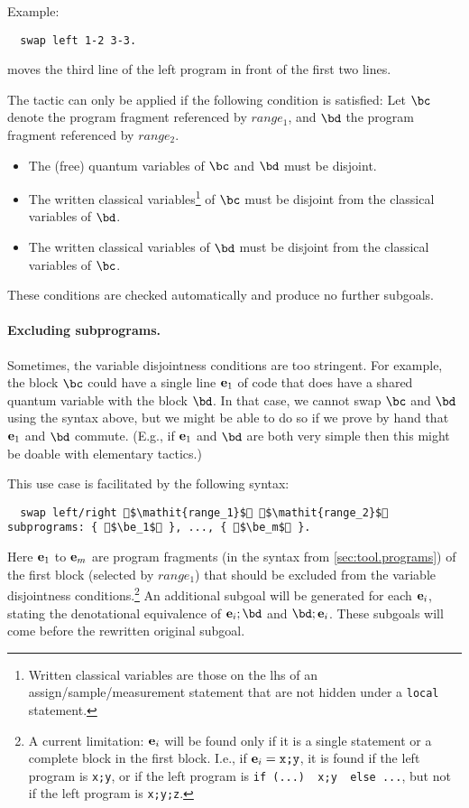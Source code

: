 \documentclass{article}
\begin{document}
Example:
\begin{lstlisting}
  swap left 1-2 3-3.
\end{lstlisting}
moves the third line of the left program in front of the first two lines.

\medskip

The tactic can only be applied if the following condition is
satisfied:
Let $\bc$ denote the program fragment referenced by $\mathit{range_1}$, and $\bd$ the program fragment referenced by $\mathit{range_2}$.
\begin{itemize}
\item The (free) quantum variables of $\bc$ and $\bd$ must be disjoint.
\item The written classical variables\footnote{Written classical variables
    are those on the lhs of an assign/sample/measurement statement
    that are not hidden under a \texttt{local} statement.}
  of $\bc$ must be disjoint from the classical variables of $\bd$.
\item The written classical variables of $\bd$ must be disjoint from the classical variables of $\bc$.
\end{itemize}
These conditions are checked automatically and produce no further subgoals.

\medskip

\paragraph{Excluding subprograms.} Sometimes, the variable disjointness conditions are too stringent.
For example, the block $\bc$ could have a single line $\mathbf e_1$ of code that does have a shared quantum variable with the block $\bd$.
In that case, we cannot swap $\bc$ and $\bd$ using the syntax above, but we might be able to do so if we prove by hand that $\mathbf e_1$ and $\bd$ commute.
(E.g., if $\mathbf e_1$ and $\bd$ are both very simple then this might be doable with elementary tactics.)

This use case is facilitated by the following syntax:
\begin{lstlisting}
  swap left/right $\mathit{range_1}$ $\mathit{range_2}$ subprograms: { $\be_1$ }, ..., { $\be_m$ }.
\end{lstlisting}
Here $\mathbf e_1$ to $\mathbf e_m$ are program fragments (in the syntax from \autoref{sec:tool.programs}) of the first block (selected by $\mathit{range_1}$) that should be excluded from the variable disjointness conditions.\footnote{%
  A current limitation: $\mathbf e_i$ will be found only if it is a single statement or a complete block in the first block.
  I.e., if $\be_i=\texttt{x;y}$, it is found if the left program is \texttt{x;y}, or if the left program is \texttt{if (...) { x;y } else ...}, but not if the left program is \texttt{x;y;z}.}
An additional subgoal will be generated for each $\mathbf e_i$, stating the denotational equivalence of $\be_i;\bd$ and $\bd;\be_i$.
These subgoals will come before the rewritten original subgoal.
\end{document}

